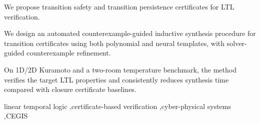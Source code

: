 \documentclass[a4paper,fleqn]{cas-sc}
\theoremstyle{definition}
\begin{document}
\begin{highlights}
\item We propose transition safety and transition persistence certificates for LTL verification.
\item We design an automated counterexample-guided inductive synthesis procedure for transition certificates using both polynomial and neural templates, with solver-guided counterexample refinement.
\item On 1D/2D Kuramoto and a two-room temperature benchmark, the method verifies the target LTL properties and consistently reduces synthesis time compared with closure certificate baselines.
\end{highlights}

\begin{keywords}
linear temporal logic \sep certificate-based verification \sep cyber-physical systems \sep CEGIS
\end{keywords}

\maketitle











\appendix

\end{document}
